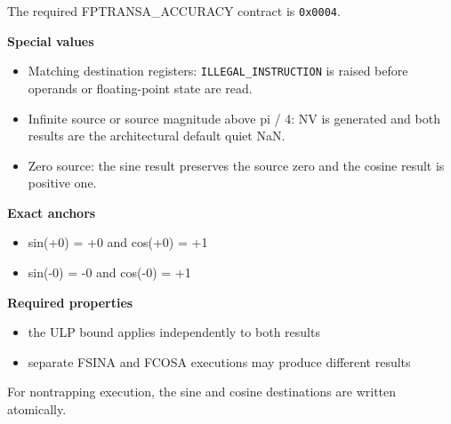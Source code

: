 The required FPTRANSA\_ACCURACY contract is \texttt{0x0004}.

\textbf{Special values}\par
\begin{itemize}
\item Matching destination registers: \texttt{ILLEGAL\_INSTRUCTION} is raised before operands or floating-point state are read.
\item Infinite source or source magnitude above pi / 4: NV is generated and both results are the architectural default quiet NaN.
\item Zero source: the sine result preserves the source zero and the cosine result is positive one.
\end{itemize}

\textbf{Exact anchors}\par
\begin{itemize}
\item sin(+0) = +0 and cos(+0) = +1
\item sin(-0) = -0 and cos(-0) = +1
\end{itemize}

\textbf{Required properties}\par
\begin{itemize}
\item the ULP bound applies independently to both results
\item separate FSINA and FCOSA executions may produce different results
\end{itemize}

For nontrapping execution, the sine and cosine destinations are written atomically.
